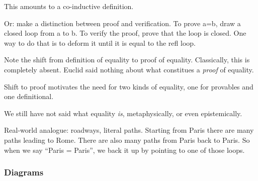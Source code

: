\documentclass{article}
\begin{document}
This amounts to a co-inductive definition.

Or: make a distinction between proof and verification. To prove a=b,
draw a closed loop from a to b. To verify the proof, prove that the
loop is closed. One way to do that is to deform it until it is equal
to the refl loop.

Note the shift from definition of equality to proof of equality.
Classically, this is completely absent. Euclid said nothing about what
constitues a \textit{proof} of equality.

Shift to proof motivates the need for two kinds of equality, one
for provables and one definitional.

We still have not said what equality \textit{is}, metaphysically, or
even epistemically.



Real-world analogue: roadways, literal paths. Starting from Paris
there are many paths leading to Rome. There are also many paths from
Paris back to Paris. So when we say ``Paris = Paris'', we back it up
by pointing to one of those loops.

\subsubsection{Diagrams}
\end{document}
